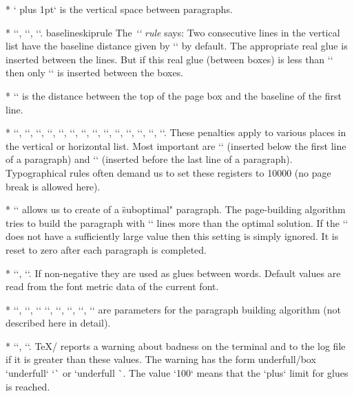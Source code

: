 {* \y`\parskip=0pt plus 1pt` is the vertical space between paragraphs.

* \y`\baselineskip=12pt`,
  \y`\lineskiplimit=0pt`,
  \y`\lineskip=1pt`.
  \ii baselineskiprule The {\em `\baselineskip` rule} says: 
  Two consecutive lines in the vertical list have the baseline distance given 
  by \x`\baselineskip` by default. The appropriate real glue is inserted
  between the lines.
  But if this real glue (between boxes) is less than \x`\lineskiplimit` 
  then only \x`\lineskip` is inserted between the boxes.

* \y`\topskip=10pt` is the distance between the top of the page box and the baseline of
  the first line.

* \y``,
  \y``,
  \y``,
  \y``,
  \y``,
  \y``,
  \y``,
  \y``,
  \y``,
  \y``,
  \y``,
  \y``,
  \y``,
  \y``.
  These penalties apply to various places in the vertical or horizontal
  list. Most important are \x`\clubpenalty` (inserted below the first line of a paragraph)
  and \x`\widowpenalty` (inserted before the last line of a paragraph). Typographical rules
  often demand us to set these registers to 10000 (no page break is allowed here).

* \y`` allows us to create of a \"suboptimal" paragraph. The page-building
  algorithm tries to build the paragraph with \x`\looseness` lines more than
  the optimal solution. If the \x`\tolerance` does not have a sufficiently large value
  then this setting is simply ignored. It is reset to zero after each
  paragraph is completed.

* \y`\spaceskip=0pt`,
  \y`\xspaceskip=0pt`. If non-negative they are used as glues between words.
  Default values are read from the font metric data of the current font.

* \y``,
  \y``, \y`\emergencystretch=0pt`
  \y``,
  \y``,
  \y``,
  \y`\hfuzz=0.1pt`,
  \y`\vfuzz=0.1pt`
are parameters for the paragraph building algorithm (not described here in
detail).

* \y``,
  \y``. \TeX/ reports a warning about \iid badness on the terminal
  and to the log file if it is greater than these values. The warning has the form
  \ii underfull/box `underfull` `\hbox` or `underfull \vbox`. The value `100`
  means that the `plus` limit for glues is reached.

}
